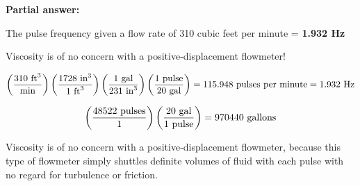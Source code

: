 \noindent
{\bf Partial answer:}

\vskip 10pt

The pulse frequency given a flow rate of 310 cubic feet per minute = {\bf 1.932 Hz}

\vskip 10pt

Viscosity is of no concern with a positive-displacement flowmeter!







$$\left( {310 \hbox{ ft}^3 \over \hbox{min}} \right)  \left( {1728 \hbox{ in}^3 \over 1 \hbox{ ft}^3} \right)  \left({1 \hbox{ gal} \over 231 \hbox{ in}^3}\right)   \left( {1 \hbox{ pulse} \over 20 \hbox{ gal}} \right) = 115.948 \hbox{ pulses per minute} = 1.932 \hbox{ Hz}$$

\vskip 10pt

$$\left({48522 \hbox{ pulses}\over 1}\right) \left({20 \hbox{ gal} \over 1 \hbox{ pulse}}\right) = 970440 \hbox{ gallons}$$

\vskip 10pt

Viscosity is of no concern with a positive-displacement flowmeter, because this type of flowmeter simply shuttles definite volumes of fluid with each pulse with no regard for turbulence or friction.





